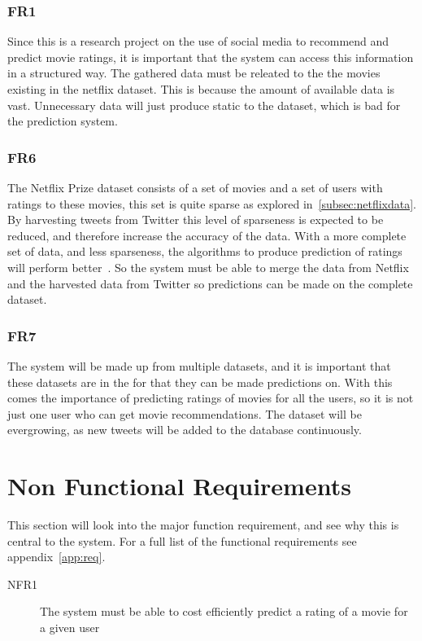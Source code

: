 \subsubsection{FR1}
Since this is a research project on the use of social media to recommend and predict movie ratings, it is important that the system can access this information in a structured way. The gathered data must be releated to the the movies existing in the netflix dataset. This is because the amount of available data is vast. Unnecessary data will just produce static to the dataset, which is bad for the prediction system.

\subsubsection{FR6}
The Netflix Prize dataset consists of a set of movies and a set of users with ratings to these movies, this set is quite sparse as explored in~\ref{subsec:netflixdata}. By harvesting tweets from Twitter this level of sparseness is expected to be reduced, and therefore increase the accuracy of the data. With a more complete set of data, and less sparseness, the algorithms to produce prediction of ratings will perform better~\cite{grobelnikDataSparsityIssues}. So the system must be able to merge the data from Netflix and the harvested data from Twitter so predictions can be made on the complete dataset.

\subsubsection{FR7}
The system will be made up from multiple datasets, and it is important that these datasets are in the for that they can be made predictions on. With this comes the importance of predicting ratings of movies for all the users, so it is not just one user who can get movie recommendations. The dataset will be evergrowing, as new tweets will be added to the database continuously.

\section{Non Functional Requirements}\label{section:non-functional-requirements}
This section will look into the major function requirement, and see why this is central to the system. For a full list of the functional requirements see appendix~\ref{app:req}.
\begin{description}
  \item[NFR1] The system must be able to cost efficiently predict a rating of a movie for a given user
\end{description}


